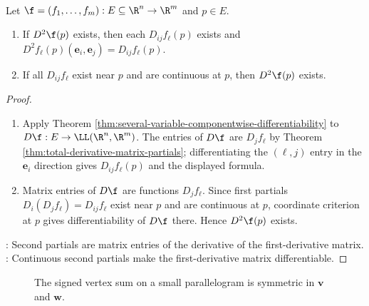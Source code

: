 \begin{theorem} \label{thm:second-derivative-partials-and-continuity} \\
Let $\f=(f_1,\ldots,f_m):E\subseteq\R^n\to\R^m$ and $p\in E$.
\begin{enumerate}[label=\roman*.]
\setlength{\itemsep}{0pt}
\item[$(\Rightarrow)$] If $D^2\f(p)$ exists, then each $D_{ij}f_\ell(p)$ exists and $D^2 f_\ell(p)(\mathbf{e}_i,\mathbf{e}_j)=D_{ij}f_\ell(p)$.
\item[$(\Leftarrow)$] If all $D_{ij}f_\ell$ exist near $p$ and are continuous at $p$, then $D^2\f(p)$ exists.
\end{enumerate}
\begin{proof}
\begin{enumerate}[label=\roman*.]
\setlength{\itemsep}{0pt}
\item[$(\Rightarrow)$] Apply Theorem \ref{thm:several-variable-componentwise-differentiability} to $D\f:E\to\LL(\R^n,\R^m)$. The entries of $D\f$ are $D_jf_\ell$ by Theorem \ref{thm:total-derivative-matrix-partials}; differentiating the $(\ell,j)$ entry in the $\mathbf{e}_i$ direction gives $D_{ij}f_\ell(p)$ and the displayed formula.
\item[$(\Leftarrow)$] Matrix entries of $D\f$ are functions $D_jf_\ell$. Since first partials $D_i(D_jf_\ell)=D_{ij}f_\ell$ exist near $p$ and are continuous at $p$, coordinate criterion at $p$ gives differentiability of $D\f$ there. Hence $D^2\f(p)$ exists.
\end{enumerate}
: Second partials are matrix entries of the derivative of the first-derivative matrix.\\
: Continuous second partials make the first-derivative matrix differentiable.
\end{proof}
\end{theorem}

\begin{figure}[H]
  \centering
  
  \caption{The signed vertex sum on a small parallelogram is symmetric in $\mathbf{v}$ and $\mathbf{w}$.}
  \label{fig:signed-parallelogram-second-derivative}
\end{figure}


